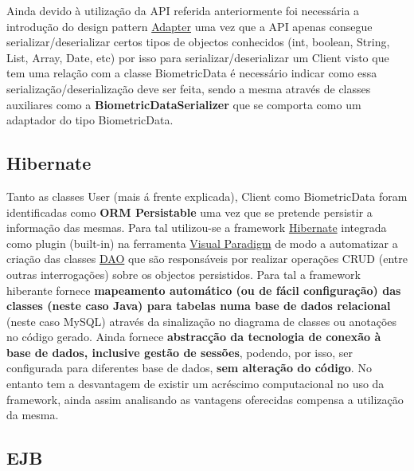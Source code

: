 Ainda devido à utilização da API referida anteriormente foi necessária a introdução do design pattern \href{https://refactoring.guru/design-patterns/adapter}{Adapter} uma vez que a API apenas consegue serializar/deserializar certos tipos de objectos conhecidos (int, boolean, String, List, Array, Date, etc) por isso para serializar/deserializar um Client visto que tem uma relação com a classe BiometricData é necessário indicar como essa serialização/deserialização deve ser feita, sendo a mesma através de classes auxiliares como a \textbf{BiometricDataSerializer} que se comporta como um adaptador do tipo BiometricData.

\subsection{Hibernate}

\hspace{5mm} Tanto as classes User (mais á frente explicada), Client como BiometricData foram identificadas como \textbf{ORM Persistable} uma vez que se pretende persistir a informação das mesmas. Para tal utilizou-se a framework \href{https://hibernate.org/}{Hibernate} integrada como plugin (built-in) na ferramenta \href{https://www.visual-paradigm.com/}{Visual Paradigm} de modo a automatizar a criação das classes \href{https://www.tutorialspoint.com/design_pattern/data_access_object_pattern.htm}{DAO} que são responsáveis por realizar operações CRUD  (entre outras interrogações) sobre os objectos persistidos. Para tal a framework hiberante fornece \textbf{mapeamento automático (ou de fácil configuração) das classes (neste caso Java) para tabelas numa base de dados relacional} (neste caso MySQL) através da sinalização no diagrama de classes ou anotações no código gerado. Ainda fornece \textbf{abstracção da tecnologia de conexão à base de dados, inclusive gestão de sessões}, podendo, por isso, ser configurada para diferentes base de dados, \textbf{sem alteração do código}. No entanto tem a desvantagem de existir um acréscimo computacional no uso da framework, ainda assim analisando as vantagens oferecidas compensa a utilização da mesma.

\subsection{EJB}

